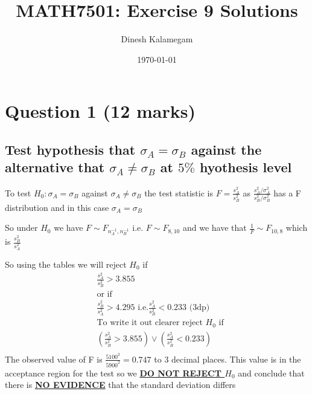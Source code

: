 \documentclass[11pt]{article}
\begin{document}
\title{MATH7501: Exercise 9 Solutions}
\author{Dinesh Kalamegam}
\date{\today}
\maketitle

\renewcommand\qedsymbol{\textbf{\emph{Quod Erat Demonstrandum}}}
\setlength{\parindent}{0pt}
\setlength{\parskip}{\baselineskip}
\newtheorem{theorem}{Theorem}[section]
\newtheorem{definition}[theorem]{Defintion}
\newtheorem{proposition}[theorem]{Proposition}
\newtheorem{corollary}[theorem]{Corollary}

\section{Question 1 (12 marks)}
\subsection{Test hypothesis that $\sigma_{A} = \sigma_{B}$ against the alternative that $\sigma_{A} \neq \sigma_{B}$ at $5\%$ hyothesis level}
To test $H_{0}: \sigma_{A} = \sigma_{B}$ against $\sigma_{A} \neq \sigma_{B}$ the test statistic is $F=\frac{s_{A}^{2}}{s_{B}^{2}}$ as $\frac{s_{A}^{2}/\sigma_{A}^{2}}{s_{B}^{2}/\sigma_{B}^{2}}$ has a F distribution and in this case $\sigma_{A} = \sigma_{B}$

So under $H_{0}$ we have $F \sim F_{n_{A}^{-1},n_{B}^{-1}}$ i.e. $F \sim F_{8,10}$ and we have that $\frac{1}{F} \sim F_{10,8}$ which is $\frac{s_{B}^{2}}{s_{A}^{2}}$

So using the tables we will reject $H_{0}$ if
\begin{align*}
  & \frac{s_{A}^{2}}{s_{B}^{2}} > 3.855 \\
  & \text{or if } \\
  &\frac{s_{B}^{2}}{s_{A}^{2}} > 4.295 \text{ i.e.} \frac{s_{A}^{2}}{s_{B}^{2}} < 0.233 \text{ (3dp)} \\
  & \text{To write it out clearer reject $H_{0}$ if} \\
  & \left(\frac{s_{A}^{2}}{s_{B}^{2}} > 3.855 \right) \lor \left(\frac{s_{A}^{2}}{s_{B}^{2}} < 0.233 \right) \\
\end{align*}
The observed value of F is $\frac{5100^{2}}{5900^{2}}=0.747$ to 3 decimal places. This value is in the acceptance region for the test so we \underline{\textbf{DO NOT REJECT $H_{0}$}} and conclude that there is \underline{\textbf{NO EVIDENCE}} that the standard deviation differs
\end{document}
